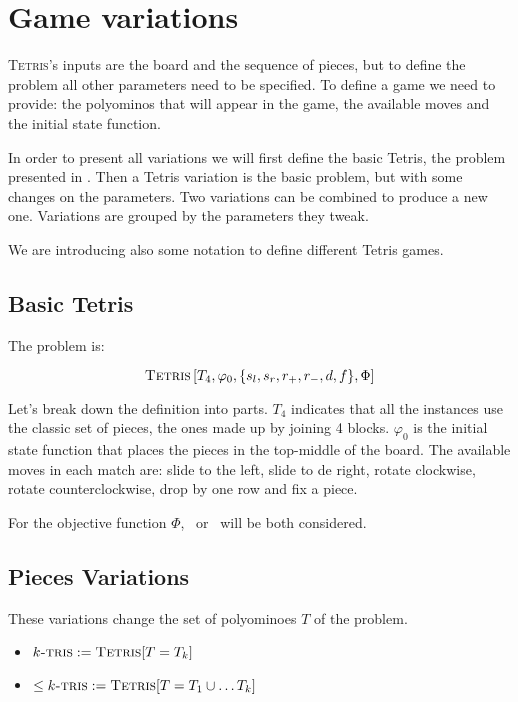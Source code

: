 \section{Game variations}

\textsc{Tetris}'s inputs are the board and the sequence of pieces, but to define the problem all other parameters need to be specified. To define a game we need to provide: the polyominos that will appear in the game, the available moves and the initial state function.

In order to present all variations we will first define the basic Tetris, the problem presented in \cite{TIH}. Then a Tetris variation is the basic problem, but with some changes on the parameters. Two variations can be combined to produce a new one. Variations are grouped by the parameters they tweak.

We are introducing also some notation to define different Tetris games. 

\subsection{Basic Tetris}

The problem is:

$$\textsc{Tetris}\left[T_4,\varphi_0, \{s_l,s_r, r_+, r_-, d, f \},\Phi \right]$$

Let's break down the definition into parts. $T_4$ indicates that all the instances use the classic set of pieces, the ones made up by joining 4 blocks. $\varphi_0$ is the initial state function that places the pieces in the top-middle of the board. The available moves in each match are: slide to the left, slide to de right, rotate clockwise, rotate counterclockwise, drop by one row and fix a piece. 

For the objective function $\Phi$, \clearing\ or \survival\ will be both considered.


\subsection{Pieces Variations}

These variations change the set of polyominoes $T$ of the problem. 

\begin{itemize}

  \item $k\textsc{-tris} := \textsc{Tetris}[T = T_k]$ 

  \item $\leq k\textsc{-tris} := \textsc{Tetris}[T = T_1 \cup \dots T_k]$

\end{itemize}

